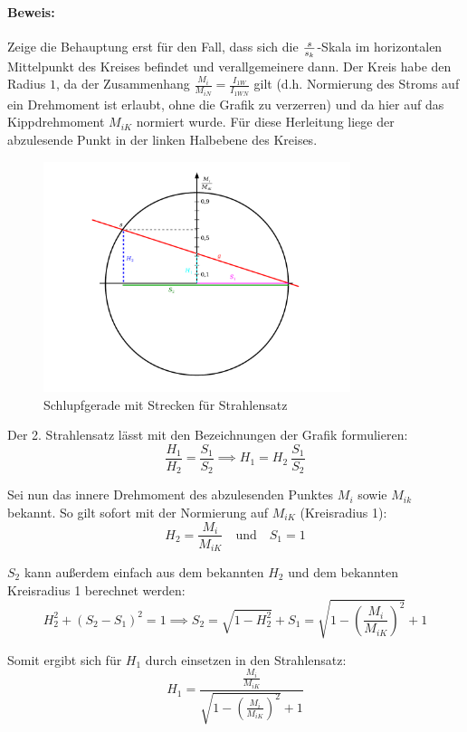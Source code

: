 \documentclass[11pt]{article}
\begin{document}
\paragraph{Beweis: } Zeige die Behauptung erst für den Fall, dass sich die $s \over s_k$-Skala im horizontalen Mittelpunkt des Kreises befindet und verallgemeinere dann. Der Kreis habe den Radius $1$, da der Zusammenhang $\frac{M_i}{M_{iN}} = \frac{I_{1W}}{I_{1WN}}$ gilt (d.h. Normierung des Stroms auf ein Drehmoment ist erlaubt, ohne die Grafik zu verzerren) und da hier auf das Kippdrehmoment $M_{iK}$ normiert wurde. Für diese Herleitung liege der abzulesende Punkt in der linken Halbebene des Kreises.

\begin{figure}[H]
	\centering
	\includegraphics[width=0.8\textwidth]{img/asynchronmaschine_schlupfgerade.pdf}
	\caption*{Schlupfgerade mit Strecken für Strahlensatz}
\end{figure}

Der 2. Strahlensatz lässt mit den Bezeichnungen der Grafik formulieren:
\[
	\frac{H_1}{H_2} = \frac{S_1}{S_2} \implies H_1 = H_2 ~ \frac{S_1}{S_2}
\]

Sei nun das innere Drehmoment des abzulesenden Punktes $M_i$ sowie $M_{ik}$ bekannt. So gilt sofort mit der Normierung auf $M_{iK}$ (Kreisradius 1):
\[
	H_2 = \frac{M_i}{M_{iK}} \quad \mathrm{und} \quad S_1 = 1
\]

$S_2$ kann außerdem einfach aus dem bekannten $H_2$ und dem bekannten Kreisradius 1 berechnet werden:
\[
	H_2^2 + (S_2 - S_1)^2 = 1 \implies S_2 = \sqrt{1 - H_2^2} + S_1 = \sqrt{1 - \left( \frac{M_i}{M_{iK}} \right)^2} + 1
\]

Somit ergibt sich für $H_1$ durch einsetzen in den Strahlensatz:
\[
	H_1 = \frac{\frac{M_i}{M_{iK}}}{\sqrt{1 - \left( \frac{M_i}{M_{iK}} \right)^2} + 1}
\]
\end{document}
